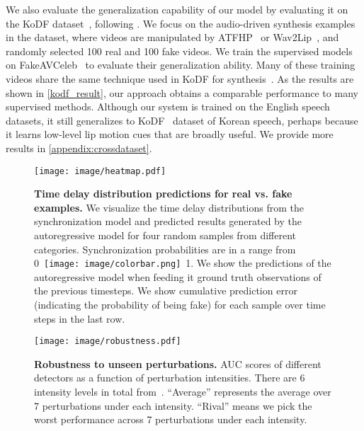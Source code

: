 \documentclass[10pt,twocolumn,letterpaper]{article}
\def\upvspacefig{\vspace{-0.0mm}}
\newcommand{\supparxiv}[2]{#2}
\begin{document}
We also evaluate the generalization capability of our model by evaluating it on the KoDF dataset~\cite{kwon2021kodf}, following \cite{haliassos2022leveraging, haliassos2021lips, zheng2021exploring, zhou2021joint}. We focus on the audio-driven synthesis examples in the dataset, where videos are manipulated by ATFHP~\cite{yi2020audio} or Wav2Lip~\cite{prajwal2020lip}, and randomly selected 100 real and 100 fake videos. We train the supervised models on FakeAVCeleb~\cite{NEURIPS_DATASETS_AND_BENCHMARKS2021_d9d4f495} to evaluate their generalization ability. Many of these training videos share the same technique used in KoDF for synthesis~\cite{prajwal2020lip}. As the results are shown in \cref{kodf_result}, our approach obtains a comparable performance to many supervised methods. Although our system is trained on the English speech datasets, it still generalizes to KoDF~\cite{kwon2021kodf} dataset of Korean speech, perhaps because it learns low-level lip motion cues that are broadly useful. We provide more results in \supparxiv{the supplement}{\cref{appendix:crossdataset}}.






\begin{figure}[t!]
    \centering
    \upvspacefig
    \texttt{[image: image/heatmap.pdf]}
    \caption{\textbf{Time delay distribution predictions for real vs. fake examples.} We visualize the time delay distributions from the synchronization model and predicted results generated by the autoregressive model for four random samples from different categories. Synchronization probabilities are in a range from 0~\texttt{[image: image/colorbar.png]}~1. We show the predictions of the autoregressive model when feeding it ground truth observations of the previous timesteps. We show cumulative prediction error (indicating the probability of being fake) for each sample over time steps in the last row. } \label{heatmap}
\end{figure} 
\begin{figure*}[t!]
    \centering
    \upvspacefig
 \texttt{[image: image/robustness.pdf]}
    \caption{\textbf{Robustness to unseen perturbations.} AUC scores  of different detectors as a function of perturbation intensities. There are 6 intensity levels in total from~\cite{jiang2020deeperforensics}. ``Average'' represents the average over 7 perturbations under each intensity. ``Rival'' means we pick the worst performance across 7 perturbations under each intensity.}
    \label{robustness}
\end{figure*}
\end{document}
